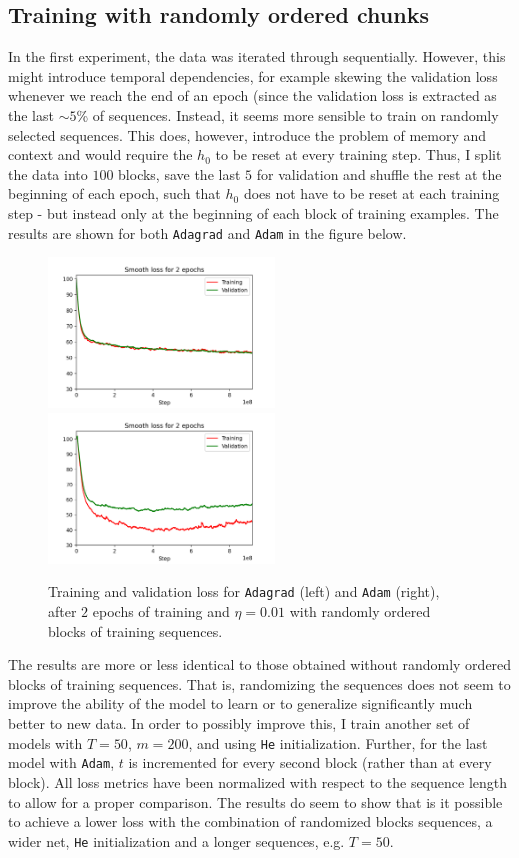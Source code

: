 \documentclass{article}
\begin{document}
\subsection*{Training with randomly ordered chunks}
	In the first experiment, the data was iterated through sequentially. However, this might introduce temporal dependencies, for example skewing the validation loss whenever we reach the end of an epoch (since the validation loss is extracted as the last $\sim5$\% of sequences. Instead, it seems more sensible to train on randomly selected sequences. This does, however, introduce the problem of memory and context and would require the $h_0$ to be reset at every training step. Thus, I split the data into $100$ blocks, save the last $5$ for validation and shuffle the rest at the beginning of each epoch, such that $h_0$ does not have to be reset at each training step - but instead only at the beginning of each block of training examples. The results are shown for both \texttt{Adagrad} and \texttt{Adam} in the figure below.
	\begin{figure}[h!]
		\centering
		\includegraphics[width=6cm]{../plots/rnn_loss_v3.png}
		\includegraphics[width=6cm]{../plots/rnn_loss_v4.png}
		\caption{Training and validation loss for \texttt{Adagrad} (left) and \texttt{Adam} (right), after $2$ epochs of training and $\eta = 0.01$ with randomly ordered blocks of training sequences.}
 	\end{figure}
	The results are more or less identical to those obtained without randomly ordered blocks of training sequences. That is, randomizing the sequences does not seem to improve the ability of the model to learn or to generalize significantly much better to new data. In order to possibly improve this, I train another set of models with $T=50$,  $m = 200$, and using \texttt{He} initialization. Further, for the last model with \texttt{Adam}, $t$ is incremented for every second block (rather than at every block). All loss metrics have been normalized with respect to the sequence length to allow for a proper comparison. The results do seem to show that is it possible to achieve a lower loss with the combination of randomized blocks sequences, a wider net, \texttt{He} initialization and a longer sequences, e.g. $T = 50$.
\end{document}
